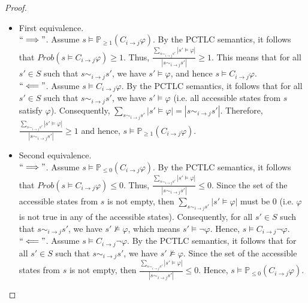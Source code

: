 \begin{proof}\hspace{-0.9cm}%

\begin{itemize}
\item First equivalence. ~\\
    $``\Longrightarrow"$. Assume $s\models \mathbb{P}_{\geq1} (C_{i \rightarrow j}\varphi)$.
    By the PCTLC semantics, it follows that $Prob(s\models C_{i\rightarrow j}\varphi)\geq1$.
    Thus,  $\frac{\sum_{s\sim_{i \rightarrow j}s'}|s'\models \varphi| }{|s\sim_{i \rightarrow j}s'|}\geq1$.
    This means that for all $s'\in S$ such that $s\sim_{i \rightarrow j}s'$, we have
    $s'\models \varphi$, and hence $s \models C_{i\rightarrow j}\varphi$. \\
    $``\Longleftarrow"$. Assume $s\models C_{i \rightarrow j}\varphi$. By the
    PCTLC semantics, it follows that for all $s'\in S$ such that $s\sim_{i \rightarrow j}s'$,
    we have $s'\models \varphi$ (i.e. all accessible states from $s$ satisfy $\varphi$).
    Consequently, $\sum_{s\sim_{i \rightarrow j}s'}|s'\models \varphi| = |s\sim_{i \rightarrow j}s'|$.
    Therefore, $\frac{\sum_{s\sim_{i \rightarrow j}s'}|s'\models \varphi| }{|s\sim_{i \rightarrow j}s'|}\geq1$
    and hence, $s\models \mathbb{P}_{\geq1} (C_{i \rightarrow j}\varphi)$.

\item Second equivalence. ~\\
    $``\Longrightarrow"$. Assume $s\models \mathbb{P}_{\leq0} (C_{i \rightarrow j}\varphi)$.
    By the PCTLC semantics, it follows that $Prob(s\models C_{i\rightarrow j}\varphi)\leq0$.
    Thus, $\frac{\sum_{s\sim_{i \rightarrow j}s'}|s'\models \varphi|}{|s\sim_{i \rightarrow j}s'|}\leq0$.
    Since the set of the accessible states from $s$ is not empty, then $\sum_{s\sim_{i \rightarrow j}s'}|s'\models \varphi|$
    must be 0 (i.e. $\varphi$ is not true in any of the accessible states). Consequently, for all $s'\in S$
    such that $s\sim_{i \rightarrow j}s'$, we have $s'\nvDash \varphi$, which means $s'\vDash \neg \varphi$.
     Hence, $s\models C_{i\rightarrow j}\neg \varphi$.~\\
%
    $``\Longleftarrow"$. Assume $s\models C_{i \rightarrow j}\neg \varphi$. By the PCTLC semantics,
    it follows that for all $s'\in S$ such that
    $s\sim_{i \rightarrow j}s'$, we have $s'\nvDash \varphi$. Since the set of the accessible states from $s$ is not empty,
    then $\frac{\sum_{s\sim_{i \rightarrow j}s'}|s'\models \varphi| }{|s\sim_{i \rightarrow j}s'|}\leq0$.
    Hence, $s\models \mathbb{P}_{\leq0} (C_{i \rightarrow j}\varphi)$.


\end{itemize}
\end{proof}

